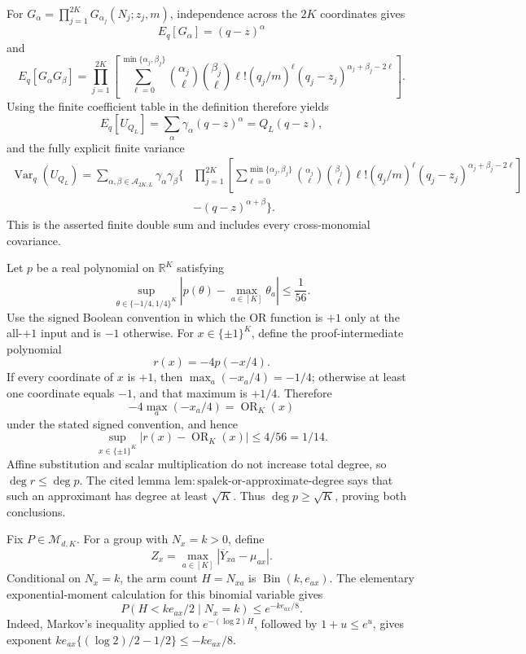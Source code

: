 For \(G_\alpha=\prod_{j=1}^{2K}G_{\alpha_j}(N_j;z_j,m)\), independence across the \(2K\) coordinates gives
\[
 E_q[G_\alpha]=(q-z)^\alpha
\]
and
\[
 E_q[G_\alpha G_\beta]
 =\prod_{j=1}^{2K}\left[
   \sum_{\ell=0}^{\min\{\alpha_j,\beta_j\}}
   \binom{\alpha_j}\ell\binom{\beta_j}\ell\ell!
   (q_j/m)^\ell(q_j-z_j)^{\alpha_j+\beta_j-2\ell}
 \right].
\]
Using the finite coefficient table in the definition therefore yields
\[
 E_q[U_{Q_L}]=\sum_\alpha\gamma_\alpha(q-z)^\alpha=Q_L(q-z),
\]
and the fully explicit finite variance
\[
 \begin{aligned}
 \operatorname{Var}_q(U_{Q_L})
 =\sum_{\alpha,\beta\in\mathcal A_{2K,L}}\gamma_\alpha\gamma_\beta
 \Bigg\{&\prod_{j=1}^{2K}\left[
   \sum_{\ell=0}^{\min\{\alpha_j,\beta_j\}}
   \binom{\alpha_j}\ell\binom{\beta_j}\ell\ell!
   (q_j/m)^\ell(q_j-z_j)^{\alpha_j+\beta_j-2\ell}
 \right]\\
 &-(q-z)^{\alpha+\beta}\Bigg\}.
 \end{aligned}
\]
This is the asserted finite double sum and includes every cross-monomial covariance.

Let \(p\) be a real polynomial on \(\mathbb R^K\) satisfying
\[
 \sup_{\theta\in\{-1/4,1/4\}^K}
 \left|p(\theta)-\max_{a\in[K]}\theta_a\right|\leq\frac1{56}.
\]
Use the signed Boolean convention in which the OR function is \(+1\) only at the all-\(+1\) input and is \(-1\) otherwise.  For \(x\in\{\pm1\}^K\), define the proof-intermediate polynomial
\[
 r(x)=-4p(-x/4).
\]
If every coordinate of \(x\) is \(+1\), then \(\max_a(-x_a/4)=-1/4\); otherwise at least one coordinate equals \(-1\), and that maximum is \(+1/4\).  Therefore
\[
 -4\max_a(-x_a/4)=\operatorname{OR}_K(x)
\]
under the stated signed convention, and hence
\[
 \sup_{x\in\{\pm1\}^K}|r(x)-\operatorname{OR}_K(x)|\leq4/56=1/14.
\]
Affine substitution and scalar multiplication do not increase total degree, so \(\deg r\leq\deg p\).  The cited lemma \(\mathrm{lem{:}spalek\text{-}or\text{-}approximate\text{-}degree}\) says that such an approximant has degree at least \(\sqrt K\).  Thus \(\deg p\geq\sqrt K\), proving both conclusions.

Fix \(P\in\mathcal M_{d,K}\).  For a group with \(N_x=k>0\), define
\[
 Z_x=\max_{a\in[K]}|\overline Y_{xa}-\mu_{ax}|.
\]
Conditional on \(N_x=k\), the arm count \(H=N_{xa}\) is \(\operatorname{Bin}(k,e_{ax})\).  The elementary exponential-moment calculation for this binomial variable gives
\[
 P(H<ke_{ax}/2\mid N_x=k)\leq e^{-ke_{ax}/8}.
\]
Indeed, Markov's inequality applied to \(e^{-(\log2)H}\), followed by \(1+u\leq e^u\), gives exponent
\(ke_{ax}\{(\log2)/2-1/2\}\leq-ke_{ax}/8\).

